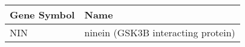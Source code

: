 \begin{tabular}{ll}
\toprule
Gene Symbol &                               Name \\
\midrule
        NIN & ninein (GSK3B interacting protein) \\
\bottomrule
\end{tabular}
